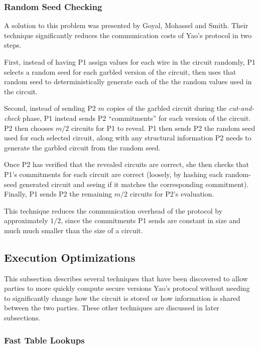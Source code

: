 \subsubsection{Random Seed Checking}

A solution to this problem was presented by Goyal, Mohassel and Smith\cite{goyal2008efficient}. Their technique significantly reduces the communication costs of Yao's protocol in two steps.

First, instead of having \ac{P1} assign values for each wire in the circuit randomly, \ac{P1} selects a random seed for each garbled version of the circuit, then uses that random seed to deterministically generate each of the the random values used in the circuit.

Second, instead of sending \ac{P2} $m$ copies of the garbled circuit during the \emph{cut-and-check} phase, \ac{P1} instead sends \ac{P2} ``commitments'' for each version of the circuit.  \ac{P2} then chooses $m/2$ circuits for \ac{P1} to reveal.  \ac{P1} then sends \ac{P2} the random seed used for each selected circuit, along with any structural information \ac{P2} needs to generate the garbled circuit from the random seed.

Once \ac{P2} has verified that the revealed circuits are correct, she then checks that \ac{P1}'s commitments for each circuit are correct (loosely, by hashing each random-seed generated circuit and seeing if it matches the corresponding commitment).  Finally, \ac{P1} sends \ac{P2} the remaining $m/2$ circuits for \ac{P2}'s evaluation.

This technique reduces the communication overhead of the protocol by approximately $1/2$, since the commitments \ac{P1} sends are constant in size and much much smaller than the size of a circuit.


\subsection{Execution Optimizations}

This subsection describes several techniques that have been discovered to allow parties to more quickly compute secure versions Yao's protocol without needing to significantly change how the circuit is stored or how information is shared between the two parties.  These other techniques are discussed in later subsections.

\subsubsection{Fast Table Lookups}

